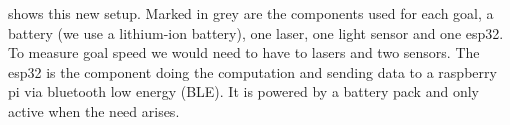  shows this new setup. Marked in grey are the components used for each goal, a battery (we use a lithium-ion battery), one laser, one light sensor and one esp32. To measure goal speed we would need to have to lasers and two sensors. The esp32 is the component doing the computation and sending data to a raspberry pi via bluetooth low energy (BLE). It is powered by a battery pack and only active when the need arises.\\

